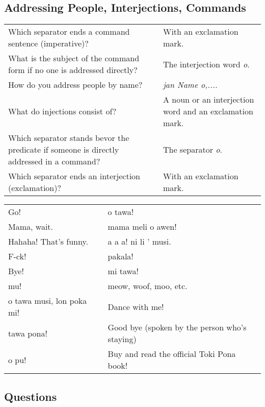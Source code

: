 \subsection*{Addressing People, Interjections, Commands} 
\label{'commands_interjections'}
%
\begin{supertabular}{p{5,5cm}|ll}
Which separator ends a command sentence (imperative)? && With an exclamation mark. \\ %
What is the subject of the command form if no one is addressed directly? && The interjection word \textit{o}. \\ %
How do you address people by name? && \textit{jan Name o,.... } \\ %
What do injections consist of? && A noun or an interjection word and an exclamation mark. \\ %
Which separator stands bevor  the predicate if someone is directly addressed in a command? && The separator \textit{o}. \\ %
Which separator ends an interjection (exclamation)? && With an exclamation mark. \\ %
\end{supertabular}

\begin{supertabular}{p{5,5cm}|ll}
Go!  && o tawa! \\ %
Mama, wait.  && mama meli o awen! \\ %
Hahaha! That's funny.  && a a a! ni li ' musi. \\ %
F-ck! && pakala! \\ %
Bye!  && mi tawa!  \\ %
mu!  && meow, woof, moo, etc. \\
o tawa musi, lon poka mi!  && Dance with me! \\
tawa pona!  && Good bye (spoken by the person who's staying) \\
o pu! && Buy and read the official Toki Pona book! \\
\end{supertabular} 

\subsection*{Questions} 
\label{'questions_using_seme'}
%

